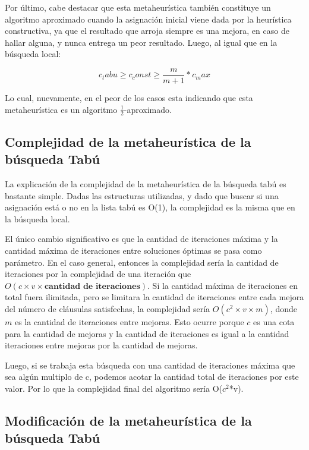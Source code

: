 \documentclass[a4paper,10pt]{article}
\begin{document}
Por \'ultimo, cabe destacar que esta metaheur\'istica tambi\'en constituye un algoritmo aproximado cuando la asignaci\'on inicial viene dada por la heur\'istica constructiva, ya que el resultado que arroja siempre es una mejora, en caso de hallar alguna, y nunca entrega un peor resultado. Luego, al igual que en la b\'usqueda local:

\begin{equation}
c_tabu \geq c_const \geq \frac{m}{m+1}*c_max
\end{equation}

Lo cual, nuevamente, en el peor de los casos esta indicando que esta metaheur\'istica es un algoritmo $\frac{1}{2}$-aproximado.


\subsection*{Complejidad de la metaheur\'istica de la b\'usqueda Tab\'u}

La explicaci\'on de la complejidad de la metaheur\'istica de la b\'usqueda tab\'u es bastante simple. Dadas las estructuras utilizadas, y dado que buscar si una asignaci\'on est\'a o no en la lista tab\'u es O(1), la complejidad es la misma que en la b\'usqueda local.

El \'unico cambio significativo es que la cantidad de iteraciones m\'axima y la cantidad máxima de iteraciones entre soluciones \'optimas se pasa como par\'ametro. En el caso general, entonces la complejidad ser\'ia la cantidad de iteraciones por la complejidad de
una iteraci\'on que$ O\left( c \times v \times \textbf{cantidad de iteraciones}
\right)$.
Si la cantidad máxima de iteraciones en total fuera ilimitada, pero se limitara la cantidad de iteraciones entre cada mejora del número de cl\'ausulas satisfechas, la complejidad sería $O\left( c^2 \times v \times m \right)$, donde
$m$ es la cantidad de iteraciones entre mejoras. Esto ocurre porque $c$ es una cota para la cantidad de mejoras y la cantidad de iteraciones es igual a la cantidad iteraciones entre mejoras por la cantidad de mejoras.

Luego, si se trabaja esta b\'usqueda con una cantidad de iteraciones m\'axima que sea alg\'un multiplo de c, podemos acotar la cantidad total de iteraciones por este valor. Por lo que la complejidad final del algoritmo ser\'ia O($c^2$*v).


\subsection*{Modificaci\'on de la metaheur\'istica de la b\'usqueda Tab\'u}
\end{document}
